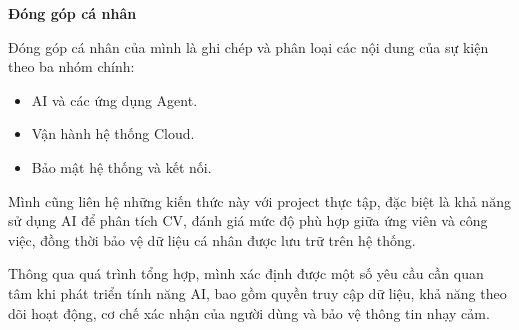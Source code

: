 \vspace{0.5em}\noindent\textbf{Đóng góp cá nhân}\par

Đóng góp cá nhân của mình là ghi chép và phân loại các nội dung của sự
kiện theo ba nhóm chính:

\begin{itemize}
\tightlist
\item
  AI và các ứng dụng Agent.
\item
  Vận hành hệ thống Cloud.
\item
  Bảo mật hệ thống và kết nối.
\end{itemize}

Mình cũng liên hệ những kiến thức này với project thực tập, đặc biệt là
khả năng sử dụng AI để phân tích CV, đánh giá mức độ phù hợp giữa ứng
viên và công việc, đồng thời bảo vệ dữ liệu cá nhân được lưu trữ trên hệ
thống.

Thông qua quá trình tổng hợp, mình xác định được một số yêu cầu cần quan
tâm khi phát triển tính năng AI, bao gồm quyền truy cập dữ liệu, khả
năng theo dõi hoạt động, cơ chế xác nhận của người dùng và bảo vệ thông
tin nhạy cảm.
